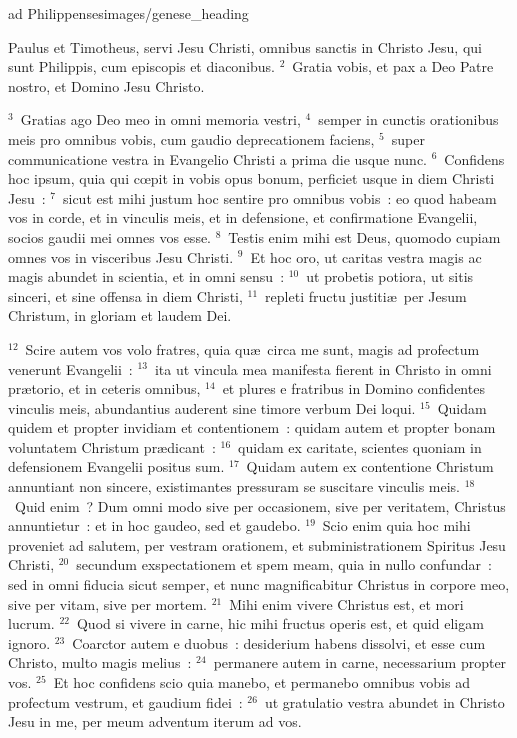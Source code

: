 {ad Philippenses}{images/genese_heading}


\lettrine[lines=6,image=true,loversize=0.05,lraise=-0.03]{P}{}aulus et Timotheus, servi Jesu Christi, omnibus sanctis in Christo Jesu, qui sunt Philippis, cum episcopis et diaconibus.
${}^{2}$~Gratia vobis, et pax a Deo Patre nostro, et Domino Jesu Christo.


${}^{3}$~Gratias ago Deo meo in omni memoria vestri,
${}^{4}$~semper in cunctis orationibus meis pro omnibus vobis, cum gaudio deprecationem faciens,
${}^{5}$~super communicatione vestra in Evangelio Christi a prima die usque nunc.
${}^{6}$~Confidens hoc ipsum, quia qui cœpit in vobis opus bonum, perficiet usque in diem Christi Jesu~:
${}^{7}$~sicut est mihi justum hoc sentire pro omnibus vobis~: eo quod habeam vos in corde, et in vinculis meis, et in defensione, et confirmatione Evangelii, socios gaudii mei omnes vos esse.
${}^{8}$~Testis enim mihi est Deus, quomodo cupiam omnes vos in visceribus Jesu Christi.
${}^{9}$~Et hoc oro, ut caritas vestra magis ac magis abundet in scientia, et in omni sensu~:
${}^{10}$~ut probetis potiora, ut sitis sinceri, et sine offensa in diem Christi,
${}^{11}$~repleti fructu justiti\ae\ per Jesum Christum, in gloriam et laudem Dei.


${}^{12}$~Scire autem vos volo fratres, quia qu\ae\ circa me sunt, magis ad profectum venerunt Evangelii~:
${}^{13}$~ita ut vincula mea manifesta fierent in Christo in omni pr\ae torio, et in ceteris omnibus,
${}^{14}$~et plures e fratribus in Domino confidentes vinculis meis, abundantius auderent sine timore verbum Dei loqui.
${}^{15}$~Quidam quidem et propter invidiam et contentionem~: quidam autem et propter bonam voluntatem Christum pr\ae dicant~:
${}^{16}$~quidam ex caritate, scientes quoniam in defensionem Evangelii positus sum.
${}^{17}$~Quidam autem ex contentione Christum annuntiant non sincere, existimantes pressuram se suscitare vinculis meis.
${}^{18}$~Quid enim~? Dum omni modo sive per occasionem, sive per veritatem, Christus annuntietur~: et in hoc gaudeo, sed et gaudebo.
${}^{19}$~Scio enim quia hoc mihi proveniet ad salutem, per vestram orationem, et subministrationem Spiritus Jesu Christi,
${}^{20}$~secundum exspectationem et spem meam, quia in nullo confundar~: sed in omni fiducia sicut semper, et nunc magnificabitur Christus in corpore meo, sive per vitam, sive per mortem.
${}^{21}$~Mihi enim vivere Christus est, et mori lucrum.
${}^{22}$~Quod si vivere in carne, hic mihi fructus operis est, et quid eligam ignoro.
${}^{23}$~Coarctor autem e duobus~: desiderium habens dissolvi, et esse cum Christo, multo magis melius~:
${}^{24}$~permanere autem in carne, necessarium propter vos.
${}^{25}$~Et hoc confidens scio quia manebo, et permanebo omnibus vobis ad profectum vestrum, et gaudium fidei~:
${}^{26}$~ut gratulatio vestra abundet in Christo Jesu in me, per meum adventum iterum ad vos.


